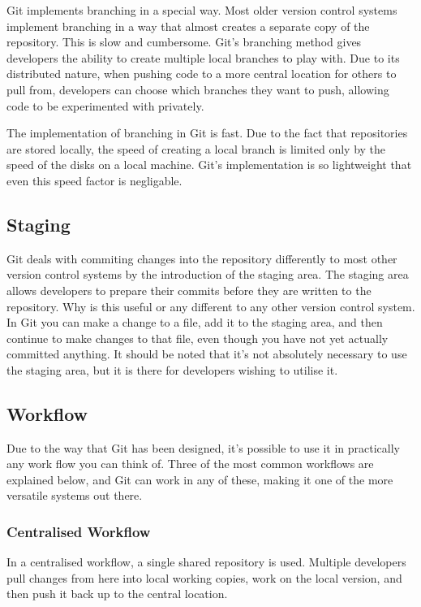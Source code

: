 Git implements branching in a special way.
Most older version control systems implement branching in a way that almost creates a separate copy of the repository.
This is slow and cumbersome.
Git's branching method gives developers the ability to create multiple local branches to play with.
Due to its distributed nature, when pushing code to a more central location for others to pull from, developers can choose which branches they want to push, allowing code to be experimented with privately.

The implementation of branching in Git is fast.
Due to the fact that repositories are stored locally, the speed of creating a local branch is limited only by the speed of the disks on a local machine.
Git's implementation is so lightweight that even this speed factor is negligable.

\subsection{Staging}
Git deals with commiting changes into the repository differently to most other version control systems by the introduction of the staging area.
The staging area allows developers to prepare their commits before they are written to the repository.
Why is this useful or any different to any other version control system.
In Git you can make a change to a file, add it to the staging area, and then continue to make changes to that file, even though you have not yet actually committed anything.
It should be noted that it's not absolutely necessary to use the staging area, but it is there for developers wishing to utilise it.

\subsection{Workflow}
Due to the way that Git has been designed, it's possible to use it in practically any work flow you can think of.
Three of the most common workflows are explained below, and Git can work in any of these, making it one of the more versatile systems out there.

\subsubsection{Centralised Workflow}
In a centralised workflow, a single shared repository is used.
Multiple developers pull changes from here into local working copies, work on the local version, and then push it back up to the central location.

